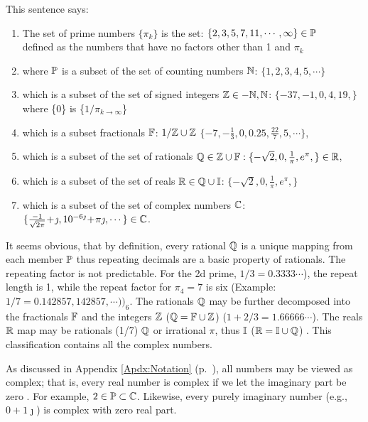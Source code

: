 \documentclass{ximera}
\begin{document}

This sentence says:
\begin{enumerate}
	\item The set of prime numbers $\{\pi_k\}$ is the set: $\{2,3,5,7,11, \cdots ,\infty\}\in\P$
\\ defined as the numbers that have no factors other than 1 and $\pi_k$
	\item where $\P$ is a subset of the set of counting numbers $\N$: $\{1,2,3,4,5,\cdots\}$ %
	\item which is a subset of the set of signed integers $\Z\in -\N, \N$: $\{-37,-1, 0, 4, 19, \}$
		\\ where \{0\} is \{$1/\pi_{k {\rightarrow\infty}}$\}
	\item which is a subset fractionals $\F$: $1/\Z \cup \Z$ $\{-7,-\frac{1}{3},0, 0.25,\frac{22}{7}, 5,\cdots\}$,
	\item which is a subset of the set of rationals $\Q\in\Z\cup\F: \{-\sqrt{2}, 0, \frac{1}{\pi}, e^\pi,\}\in\R$,
	\item which is a subset of the set of reals $\R \in \Q\cup\I$: $\{-\sqrt{2}, 0, \frac{1}{\pi}, e^\pi,\}$%
	\item which is a subset of the set of complex numbers $\C$: $\{\frac{-1}{\sqrt{2\pi}}\!+\!\jmath, 10^{-6\jmath}\!+\!\pi\jmath,\cdots\}\in\C$. 
\end{enumerate}

It seems obvious, that by definition, every rational $\Q$ is a unique mapping from each member $\P$
thus repeating decimals are a basic property of rationals.
The repeating factor is not predictable.
For the 2d prime, $1/3 = 0.3333 \cdots$), the repeat length is 1, while the repeat factor for $\pi_4=7$ is six
(Example: $1/7=0.142857,142857,\cdots))_6$.
The rationals $\Q$ may be further decomposed into the fractionals $\F$ and the integers $\Z$ ($\Q = \F \cup \Z$)
($1+2/3 = 1.66666\cdots$).
The reals $\R$ map may be rationals (1/7) $\Q$ or irrational $\pi$, thus $\I$ ($\R = \I \cup \Q$)
 \citep{HardyWright38,apostol2013}.
This classification contains all the complex numbers.

As discussed in Appendix \ref{Apdx:Notation} (p.~\pageref{Apdx:Notation}), all numbers may be viewed as
complex; that is, every real number is complex if we let the imaginary part be zero \citep{Boas87}. 
For example, $2 \in \P \subset \C$.  Likewise, every purely imaginary number (e.g., $0+1\jmath$) is
complex with zero real part. 
\end{document}
